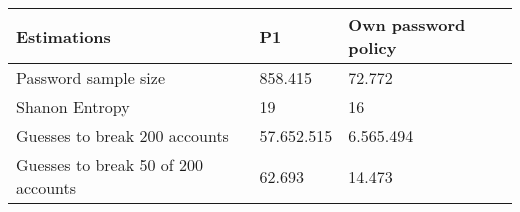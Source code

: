 \begin{enumerate}[(a)]
\begin{enumerate}[]
        \begin{tabular}{l|l|l}
            \textbf{Estimations} & \textbf{P1} & \textbf{Own password policy}\\ 
            \hline  
            Password sample size & 858.415 & 72.772 \\
            Shanon Entropy & 19 & 16\\
            Guesses to break 200 accounts & 57.652.515 & 6.565.494 \\
            Guesses to break 50 of 200 accounts & 62.693 & 14.473\\
        \end{tabular}
        
    \end{enumerate} 
    
\end{enumerate}

